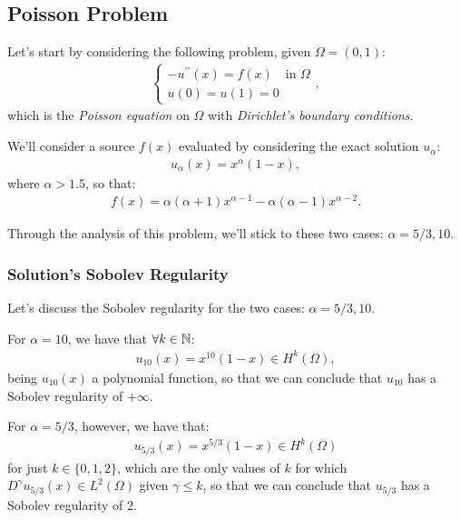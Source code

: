 \subsection{Poisson Problem}

Let's start by considering the following problem, given \(\Omega = (0, 1)\):
\begin{gather}
	\begin{cases}
		-u^{\prime \prime}(x) = f(x) \quad \text{in } \Omega \\
		u(0) = u(1) = 0
	\end{cases},
\end{gather}
which is the \textit{Poisson equation} on \(\Omega\) with \textit{Dirichlet's boundary conditions}.

We'll consider a source \(f(x)\) evaluated by considering the exact solution \(u_{\alpha}\):
\begin{gather}
	u_{\alpha}(x) = x^{\alpha} (1 - x),
\end{gather}
where \(\alpha > 1.5\), so that:
\begin{gather}
	f(x) = \alpha (\alpha + 1) x^{\alpha - 1} - \alpha (\alpha - 1) x^{\alpha - 2}.
\end{gather}

Through the analysis of this problem, we'll stick to these two cases: \(\alpha = 5/3, 10\).

\subsubsection{Solution's Sobolev Regularity} \label{sob_regularity}

Let's discuss the Sobolev regularity for the two cases: \(\alpha = 5/3, 10\).

For \(\alpha = 10\), we have that \(\forall k \in \mathbb{N}\):
\begin{gather}
	u_{10}(x) = x^{10} (1 - x) \in H^{k}(\Omega),
\end{gather}
being \(u_{10}(x)\) a polynomial function, so that we can conclude that \(u_{10}\) has a Sobolev regularity of \(+\infty\).

For \(\alpha = 5/3\), however, we have that:
\begin{gather}
	u_{5/3}(x) = x^{5/3} (1 - x) \in H^{k}(\Omega)
\end{gather}
for just \(k \in \{0, 1, 2\}\), which are the only values of \(k\) for which \(D^{\gamma} u_{5/3}(x) \in L^2(\Omega)\) given \(\gamma \le k\), so that we can conclude that \(u_{5/3}\) has a Sobolev regularity of \(2\).

